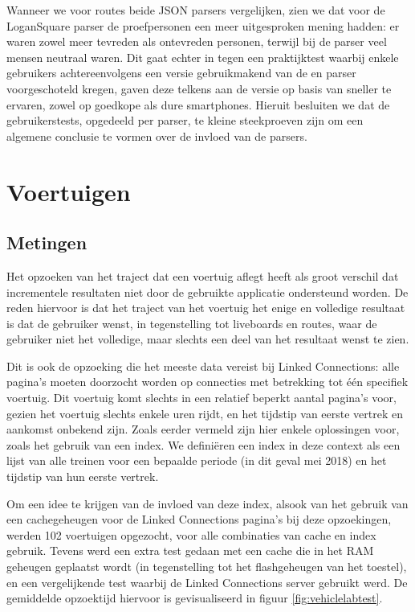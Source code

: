 Wanneer we voor routes beide JSON parsers vergelijken, zien we dat voor de LoganSquare parser de proefpersonen een meer uitgesproken mening hadden: er waren zowel meer tevreden als ontevreden personen, terwijl bij de  parser veel mensen neutraal waren. Dit gaat echter in tegen een praktijktest waarbij enkele gebruikers achtereenvolgens een versie gebruikmakend van de  en  parser voorgeschoteld kregen, gaven deze telkens aan de versie op basis van  sneller te ervaren, zowel op goedkope als dure smartphones. Hieruit besluiten we dat de gebruikerstests, opgedeeld per parser, te kleine steekproeven zijn om een algemene conclusie te vormen over de invloed van de parsers.


\section{Voertuigen}

\subsection{Metingen}
Het opzoeken van het traject dat een voertuig aflegt heeft als groot verschil dat incrementele resultaten niet door de gebruikte applicatie ondersteund worden. De reden hiervoor is dat het traject van het voertuig het enige en volledige resultaat is dat de gebruiker wenst, in tegenstelling tot liveboards en routes, waar de gebruiker niet het volledige, maar slechts een deel van het resultaat wenst te zien. 

Dit is ook de opzoeking die het meeste data vereist bij Linked Connections: alle pagina's moeten doorzocht worden op connecties met betrekking tot één specifiek voertuig. Dit voertuig komt slechts in een relatief beperkt aantal pagina's voor, gezien het voertuig slechts enkele uren rijdt, en het tijdstip van eerste vertrek en aankomst onbekend zijn. Zoals eerder vermeld %
zijn hier enkele oplossingen voor, zoals het gebruik van een index. We definiëren een index in deze context als een lijst van alle treinen voor een bepaalde periode (in dit geval mei 2018) en het tijdstip van hun eerste vertrek.

Om een idee te krijgen van de invloed van deze index, alsook van het gebruik van een cachegeheugen voor de Linked Connections pagina's bij deze opzoekingen, werden 102 voertuigen opgezocht, voor alle combinaties van cache en index gebruik. Tevens werd een extra test gedaan met een cache die in het RAM geheugen geplaatst wordt (in tegenstelling tot het flashgeheugen van het toestel), en een vergelijkende test waarbij de Linked Connections server gebruikt werd. De gemiddelde opzoektijd hiervoor is gevisualiseerd in figuur \ref{fig:vehiclelabtest}.

